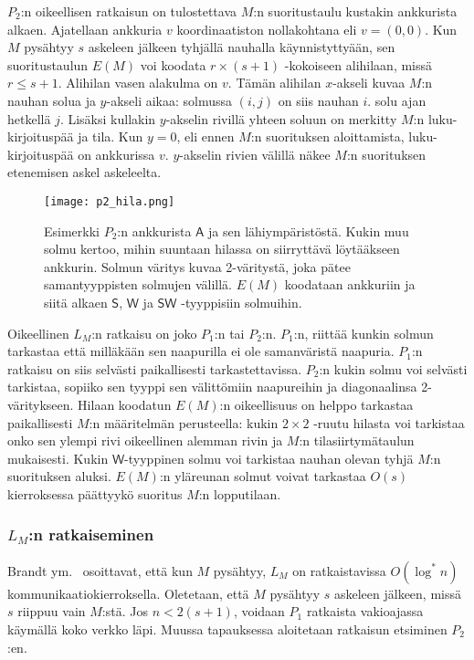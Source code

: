 \documentclass[12pt,finnish]{tktltiki2}
\theoremstyle{definition}
\theoremstyle{remark}
\begin{document}
$P_2$:n oikeellisen ratkaisun on tulostettava $M$:n suoritustaulu kustakin ankkurista alkaen. Ajatellaan ankkuria $v$ koordinaatiston nollakohtana eli $v = (0, 0)$. Kun $M$ pysähtyy $s$ askeleen jälkeen tyhjällä nauhalla käynnistyttyään, sen suoritustaulun $E(M)$ voi koodata $r \times (s+1)$ -kokoiseen alihilaan, missä $r \leq s + 1$. Alihilan vasen alakulma on $v$. Tämän alihilan $x$-akseli kuvaa $M$:n nauhan solua ja $y$-akseli aikaa: solmussa $(i, j)$ on siis nauhan $i.$ solu ajan hetkellä $j$. Lisäksi kullakin $y$-akselin rivillä yhteen soluun on merkitty $M$:n luku-kirjoituspää ja tila. Kun $y = 0$, eli ennen $M$:n suorituksen aloittamista, luku-kirjoituspää on ankkurissa $v$. $y$-akselin rivien välillä näkee $M$:n suorituksen etenemisen askel askeleelta.
\begin{figure}
  \centering
  \texttt{[image: p2\_hila.png]}
  \caption{Esimerkki $P_2$:n ankkurista $\mathsf{A}$ ja sen lähiympäristöstä. Kukin muu solmu kertoo, mihin suuntaan hilassa on siirryttävä löytääkseen ankkurin. Solmun väritys kuvaa 2-väritystä, joka pätee samantyyppisten solmujen välillä. $E(M)$ koodataan ankkuriin ja siitä alkaen $\mathsf{S}$, $\mathsf{W}$ ja $\mathsf{SW}$ -tyyppisiin solmuihin.}
\end{figure}

Oikeellinen $L_M$:n ratkaisu on joko $P_1$:n tai $P_2$:n. $P_1$:n, riittää kunkin solmun tarkastaa että milläkään sen naapurilla ei ole samanväristä naapuria. $P_1$:n ratkaisu on siis selvästi paikallisesti tarkastettavissa. $P_2$:n kukin solmu voi selvästi tarkistaa, sopiiko sen tyyppi sen välittömiin naapureihin ja diagonaalinsa 2-väritykseen. Hilaan koodatun $E(M)$:n oikeellisuus on helppo tarkastaa paikallisesti $M$:n määritelmän perusteella: kukin $2 \times 2$ -ruutu hilasta voi tarkistaa onko sen ylempi rivi oikeellinen alemman rivin ja $M$:n tilasiirtymätaulun mukaisesti. Kukin $\mathsf{W}$-tyyppinen solmu voi tarkistaa nauhan olevan tyhjä $M$:n suorituksen aluksi. $E(M)$:n yläreunan solmut voivat tarkastaa $O(s)$ kierroksessa päättyykö suoritus $M$:n lopputilaan.

\subsubsection{$L_M$:n ratkaiseminen}
Brandt ym.~\cite{brandt} osoittavat, että kun $M$ pysähtyy, $L_M$ on ratkaistavissa $O(\log^* n)$ kommunikaatiokierroksella. Oletetaan, että $M$ pysähtyy $s$ askeleen jälkeen, missä $s$ riippuu vain $M$:stä. Jos $n < 2(s + 1)$, voidaan $P_1$ ratkaista vakioajassa käymällä koko verkko läpi. Muussa tapauksessa aloitetaan ratkaisun etsiminen $P_2$:en.
\end{document}
